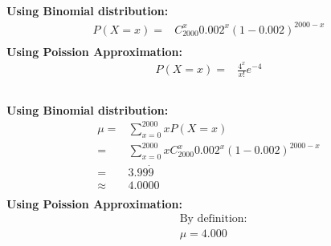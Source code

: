 \documentclass{article}
\begin{document}
        \subsection{}
            \paragraph{
                Using Binomial distribution:
                \begin{equation*}
                    \begin{split}
                        P(X=x)=&C_{2000}^x 0.002^x(1-0.002)^{2000-x}\\
                    \end{split}
                \end{equation*}
                Using Poission Approximation:
                \begin{equation*}
                    \begin{split}
                        P(X=x)=&\frac{4^x}{x!}e^{-4}\\
                    \end{split}
                \end{equation*}
            }
            \subsubsection{}
                \paragraph{
                    Using Binomial distribution:
                    \begin{equation*}
                        \begin{split}
                            \mu=&\sum_{x=0}^{2000}xP(X=x)\\
                                =&\sum_{x=0}^{2000}xC_{2000}^x0.002^x(1-0.002)^{2000-x}\\
                                =&3.99\dot{9}\\
                                \approx&4.0000\\
                        \end{split}
                    \end{equation*}
                    Using Poission Approximation:
                    \begin{equation*}
                        \begin{split}
                            &\text{By definition:}\\
                            &\mu=4.000\\
                        \end{split}
                    \end{equation*}
                }
\end{document}
